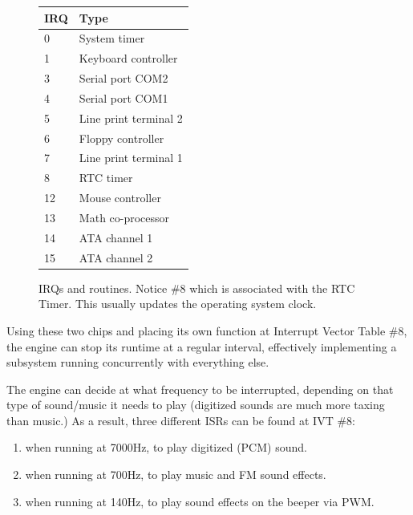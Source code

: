 \par
\begin{figure}[H]
\centering
\begin{tabularx}{\textwidth}{ X X  }
  \toprule
  \textbf{IRQ} & \textbf{Type} \\ \bottomrule
0 & System timer \\
1 & Keyboard controller \\
3 & Serial port COM2 \\ 
4 & Serial port COM1 \\
5 & Line print terminal 2 \\
6 & Floppy controller \\
7 & Line print terminal 1 \\
8 & RTC timer \\
12 & Mouse controller \\
13 & Math co-processor \\
14 & ATA channel 1 \\
15 & ATA channel 2  \\
\bottomrule
\end{tabularx}
\caption{IRQs and routines. Notice \#8 which is associated with the RTC Timer. This usually updates the operating system clock.}
\end{figure}
Using these two chips and placing its own function at Interrupt Vector Table \#8, the engine can stop its runtime at a regular interval, effectively implementing a subsystem running concurrently with everything else.\\
\par
The engine can decide at what frequency to be interrupted, depending on that type of sound/music it needs to play (digitized sounds are much more taxing than music.) As a result, three different ISRs can be found at IVT \#8: 
\begin{enumerate}
\item {} when running at 7000Hz, to play digitized (PCM) sound.
\item {} when running at 700Hz, to play music and FM sound effects.
\item {} when running at 140Hz, to play sound effects on the beeper via PWM.
\end{enumerate}
\par



